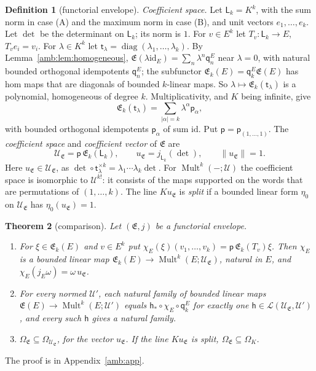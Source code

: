 \documentclass[11pt]{amsart}
\newtheorem{theorem}{Theorem}[section]
\theoremstyle{definition}
\newtheorem{definition}[theorem]{Definition}
\theoremstyle{remark}
\numberwithin{equation}{section}
\newcommand{\cL}{\mathcal L}
\newcommand{\Mult}{\operatorname{Mult}}
\newcommand{\id}{\mathrm{id}}
\newcommand{\abs}[1]{\lvert #1\rvert}
\newcommand{\norm}[1]{\lVert #1\rVert}
\theoremstyle{plain}
\theoremstyle{definition}
\theoremstyle{plain}
\begin{document}
\begin{definition}[functorial envelope]
\emph{Coefficient space.} Let $\mathsf L_k=K^k$, with the sum norm in case (A) and the maximum norm in case (B), and unit vectors $e_1,\dots,e_k$. Let $\det$ be the determinant on $\mathsf L_k$; its norm is $1$. For $v\in E^k$ let $T_v\colon\mathsf L_k\to E$, $T_ve_i=v_i$. For $\lambda\in K^k$ let $\mathsf t_\lambda=\operatorname{diag}(\lambda_1,\dots,\lambda_k)$. By Lemma~\ref{amb:lem:homogeneous}, $\mathfrak E(\lambda\id_E)=\sum_n\lambda^n\mathsf q_n^E$ near $\lambda=0$, with natural bounded orthogonal idempotents $\mathsf q_n^E$; the subfunctor $\mathfrak E_k(E)=\mathsf q_k^E\mathfrak E(E)$ has hom maps that are diagonals of bounded $k$-linear maps. So $\lambda\mapsto\mathfrak E_k(\mathsf t_\lambda)$ is a polynomial, homogeneous of degree $k$. Multiplicativity, and $K$ being infinite, give
\[
 \mathfrak E_k(\mathsf t_\lambda)=\sum_{\abs\alpha=k}\lambda^\alpha\mathsf p_\alpha,
\]
with bounded orthogonal idempotents $\mathsf p_\alpha$ of sum $\id$. Put $\mathsf p=\mathsf p_{(1,\dots,1)}$. The \emph{coefficient space} and \emph{coefficient vector} of $\mathfrak E$ are
\[
 \mathcal U_{\mathfrak E}=\mathsf p\,\mathfrak E_k(\mathsf L_k),\qquad u_{\mathfrak E}=j_{\mathsf L_k}(\det),\qquad\norm{u_{\mathfrak E}}=1.
\]
Here $u_{\mathfrak E}\in\mathcal U_{\mathfrak E}$, as $\det\circ\mathsf t_\lambda^{\times k}=\lambda_1\cdots\lambda_k\det$. For $\Mult^k(-;\mathcal U)$ the coefficient space is isomorphic to $\mathcal U^{k!}$: it consists of the maps supported on the words that are permutations of $(1,\dots,k)$. The line $Ku_{\mathfrak E}$ is \emph{split} if a bounded linear form $\eta_0$ on $\mathcal U_{\mathfrak E}$ has $\eta_0(u_{\mathfrak E})=1$.
\end{definition}

\begin{theorem}[comparison]\label{amb:thm:comparison}
Let $(\mathfrak E,j)$ be a functorial envelope.
\begin{enumerate}
\item For $\xi\in\mathfrak E_k(E)$ and $v\in E^k$ put $\chi_E(\xi)(v_1,\dots,v_k)=\mathsf p\,\mathfrak E_k(T_v)\xi$. Then $\chi_E$ is a bounded linear map $\mathfrak E_k(E)\to\Mult^k(E;\mathcal U_{\mathfrak E})$, natural in $E$, and $\chi_E(j_E\omega)=\omega\,u_{\mathfrak E}$.
\item For every normed $\mathcal U'$, each natural family of bounded linear maps $\mathfrak E(E)\to\Mult^k(E;\mathcal U')$ equals $\mathsf h_*\circ\chi_E\circ\mathsf q_k^E$ for exactly one $\mathsf h\in\cL(\mathcal U_{\mathfrak E},\mathcal U')$, and every such $\mathsf h$ gives a natural family.
\item $\Omega_{\mathfrak E}\subseteq\Omega_{\mathcal U_{\mathfrak E}}$, for the vector $u_{\mathfrak E}$. If the line $Ku_{\mathfrak E}$ is split, $\Omega_{\mathfrak E}\subseteq\Omega_K$.
\end{enumerate}
\end{theorem}
The proof is in Appendix~\ref{amb:app}.
\end{document}
